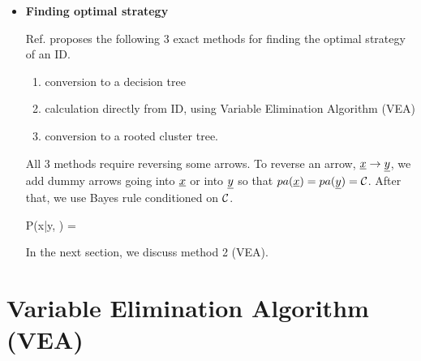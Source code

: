 \begin{itemize}
\item {\bf Finding optimal strategy }


Ref.\cite{sha-influ-diag} proposes the following 3 exact methods for
finding the optimal strategy of an ID.
\begin{enumerate}
\item conversion to a decision
tree 
\item calculation directly from ID, using Variable
Elimination Algorithm (VEA)
\item conversion to a rooted cluster tree.
\end{enumerate}

All 3 methods require  reversing some arrows. To reverse
an arrow, ${\underline{x}}\rightarrow {\underline{y}}$, we add dummy arrows going into ${\underline{x}}$ or into
${\underline{y}}$ so that $pa({\underline{x}})=pa({\underline{y}})= {\cal C}$. After that, we use Bayes rule conditioned on ${\cal C}$.


\beq
P(x|y, \calc) = 
\eeq




In the next section,
we discuss method 2 (VEA).

\end{itemize}

\section{Variable Elimination Algorithm (VEA)}


